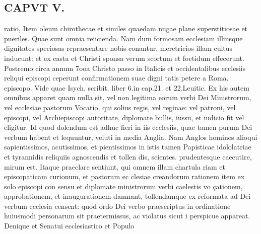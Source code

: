 \documentclass{article}
\begin{document}
\begin{pages}
\section*{CAPVT  V. }
\marginpar{[ p.363 ]}\pstart ratio, Item oleum chirothecae et similes quaedam nugae plane superstitiosae et pueriles. Quae sunt omnia reiicienda. Nam dum formosam ecclesiam illiusque dignitates speciosas repraesentare nobis conantur, meretricios illam cultus inducunt: et ex casta et Christi sponsa verum scortum et foetidum effecerunt. Postremo circa annum 7ooa Christo passo in Italicis et occidentalibus ecclesiis reliqui episcopi ceperunt confirmationem suae digni tatis petere a Roma. episcopo. Vide quae Isych. scribit. liber 6.in cap.21. et 22.Leuitic. Ex his autem omnibus apparet quam nulla sit, vel non legitima eorum verbi Dei Ministrorum, vel ecclesiae pastorum Vocatio, qui solius regis, vel reginae: vel patroni, vel episcopi, vel Archiepiscopi autoritate, diplomate bullis, iussu, et iudicio fit vel eligitur. Id quod dolendum est adhuc fieri in iis ecclesiis, quae tamen purum Dei verbum habent et lequuntur, veluti in media Anglia. Nam Anglos homines alioqui sapientissimos, acutissimos, et pientissimos in istis tamen Papisticae idololatriae et tyrannidis reliquiis agnoscendis et tollen dis, scientes. prudentesque caecutire, mirum est. Itaque praeclare sentiunt, qui omnem illam chartula riam et episcopaticam curionum, et pastorum ec clesiae creandorum rationem item ex solo episcopi con sensu et diplomate ministrorum verbi caelestis vo çationem, approbationem, et inaugurationem damnant, tollendamque  ex reformata ad Dei verbum ecclesia censent: quod ordo Dei verbo praescriptus in ordinatione huiusmodi personarum sit praetermissus, ac violatus sicut i perspicue appareat. Denique et Senatui ecclesiastico et Populo  \pend

\end{pages}
\end{document}

